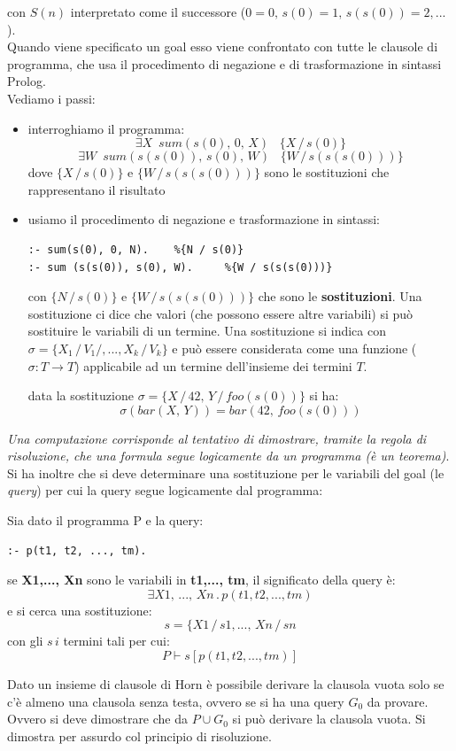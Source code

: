 \documentclass[a4paper,12pt, oneside]{book}
\begin{document}
con $S(n)$ interpretato come il successore ($0=0,\, s(0)=1, \,s(s(0))=2,... $).\\
Quando viene specificato un goal esso viene confrontato con tutte le clausole di programma, che usa il procedimento di negazione e di trasformazione in sintassi Prolog.\\
Vediamo i passi:
\begin{itemize}
\item  interroghiamo il programma:
$$\exists X\,\,\, sum(s(0),\, 0,\, X)\,\,\,\,\,\{X\,/\, s(0)\}$$
$$\exists W\,\,\, sum(s(s(0)),\, s(0), \, W)\,\,\,\,\,\{W\,/\, s(s(s(0)))\}$$
dove $\{X\,/\, s(0)\}$ e $\{W\,/\, s(s(s(0)))\}$ sono le sostituzioni che rappresentano il risultato
\item usiamo il procedimento di negazione e trasformazione in sintassi:
\begin{verbatim}
:- sum(s(0), 0, N).    %{N / s(0)}
:- sum (s(s(0)), s(0), W).     %{W / s(s(s(0)))}
\end{verbatim}
con $\{N\, /\, s(0)\}$ e $\{W \,/\, s(s(s(0)))\}$ che sono le \textbf{sostituzioni}. Una sostituzione ci dice che valori (che possono essere altre variabili) si può sostituire le variabili di un termine. Una sostituzione si indica con $\sigma=\{X_1\,/\,V_1/,..., X_k\,/\,V_k\}$ e può essere considerata come una funzione ($\sigma: T\to T$) applicabile ad un termine dell'insieme dei termini $T$.
\begin{esempio}
data la sostituzione $\sigma=\{X\,/\,42,\,Y\,/\, foo(s(0))\}$ si ha:
$$\sigma(bar(X,\,Y))=bar(42, \, foo(s(0)))$$
\end{esempio}
\end{itemize}
\newpage
\textit{Una computazione corrisponde al tentativo di dimostrare, tramite la regola di risoluzione, che una formula segue logicamente da un programma (è un teorema)}. Si ha inoltre che si deve determinare una sostituzione per le variabili del goal (le \textit{query}) per cui la query segue  logicamente dal programma:
\begin{esempio}
Sia dato il programma P e la query:
\begin{verbatim}
:- p(t1, t2, ..., tm).
\end{verbatim}
se \textbf{X1,..., Xn} sono le variabili in \textbf{t1,..., tm}, il significato della query è:
$$\exists X1,\,..., \,Xn\, . \,p(t1, t2, ..., tm)$$
e si cerca una sostituzione:
$$s=\{X1\,/\,s1,...,\, Xn\,/\,sn$$
con gli $s\,i$ termini tali per cui:
$$P\vdash s[p(t1, t2, ..., tm)]$$
\end{esempio}
Dato un insieme di clausole di Horn è possibile derivare la clausola vuota solo se c'è almeno una clausola senza testa, ovvero se si ha una query $G_0$ da provare. Ovvero si deve dimostrare che da $P\cup G_0$ si può derivare la clausola vuota. Si dimostra per assurdo col principio di risoluzione.
\end{document}
